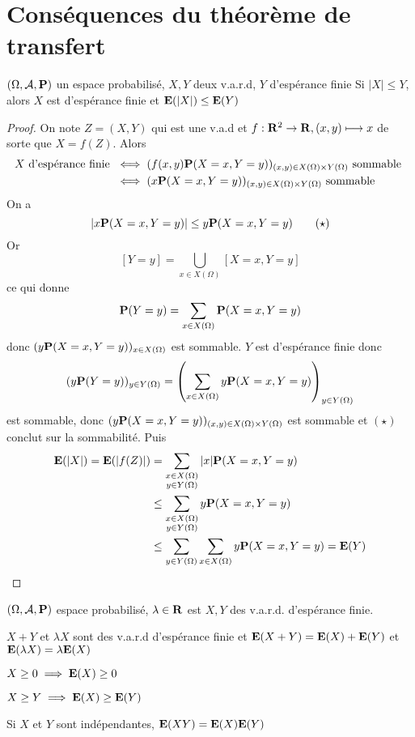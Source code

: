 \section{Conséquences du théorème de transfert}

\begin{prop}
    \Hyp $(\Omega, \mathcal  A, \P)$ un espace probabilisé, $X,Y$ deux v.a.r.d, $Y$ d'espérance finie
    \Conc Si  $|X|\leq Y$, alors  $X$ est d'espérance finie et $\E(|X|)\leq \E(Y)$
\end{prop}

\begin{proof}
    On note $Z=(X,Y)$ qui est une v.a.d et  $f:\R^2\to \R,(x,y)\longmapsto x$ de sorte que $X=f(Z)$. Alors  \begin{align*}
        X\text{ d'espérance finie } &\iff (f(x, y)\P(X=x,Y=y))_{(x,y)\in X(\Omega)\times Y(\Omega)}\text{ sommable } \\ &\iff  (x\P(X=x,Y=y))_{(x,y)\in X(\Omega)\times Y(\Omega)}\text{ sommable }
    \end{align*}
    On a \[
        |x\P(X=x,Y=y)|\leq y\P(X=x,Y=y)\tag{$\star$}
    \] 
    Or \[
    [Y=y]=\bigcup_{x \in  X(\Omega)}[X=x,Y=y]  \] ce qui donne \[   \P(Y=y)=\sum_{x \in  X(\Omega)}\P(X=x,Y=y)
    \]
    donc $(y\P(X=x,Y=y))_{x \in  X(\Omega)}$ est sommable. $Y$ est d'espérance finie donc  \[
        (y\P(Y=y))_{y\in Y(\Omega)}=\left( \sum_{x\in X(\Omega)}y\P(X=x,Y=y) \right) _{y \in  Y(\Omega)}
    \] 
    est sommable, donc $(y\P(X=x,Y=y))_{(x,y)\in  X(\Omega)\times Y(\Omega)}$ est sommable et $(\star)$ conclut sur la sommabilité. Puis  \begin{align*}
        \E(|X|)=\E(|f(Z)|)&=\sum_{\substack{x \in  X(\Omega)\\y\in Y(\Omega)}}|x|\P(X=x,Y=y)\\&\leq \sum_{\substack{x \in  X(\Omega)\\y\in Y(\Omega)}}y\P(X=x,Y=y)\\&\leq \sum_{y\in Y(\Omega)}\sum_{x\in X(\Omega)}y\P(X=x,Y=y)=\E(Y)
    \end{align*}
\end{proof}

\begin{thm}
    \Hyp $(\Omega, \mathcal A, \P)$ espace probabilisé, $\lambda\in \R$ est $X,Y$ des v.a.r.d. d'espérance finie.
     \begin{concenum}
     \item $X+Y$ et $\lambda X$ sont des v.a.r.d d'espérance finie et  $\E(X+Y)=\E(X)+\E(Y)$ et $ \E(\lambda X)=\lambda \E(X)$
     \item $X\geq 0 \implies \E(X)\geq 0$
     \item $X\geq Y\implies\E(X)\geq \E(Y)$
     \item Si $X$ et $Y$ sont indépendantes, $\E(XY)=\E(X)\E(Y)$
    \end{concenum}
\end{thm}

